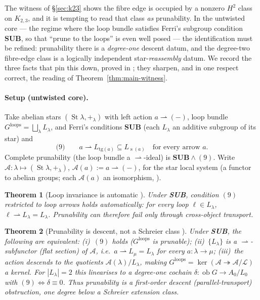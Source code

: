 \documentclass[11pt]{article}
\newtheorem{theorem}{Theorem}
\theoremstyle{definition}
\newcommand{\ob}{\operatorname{ob}}
\newcommand{\tg}{\mathrm{tg}}
\newcommand{\loops}{\mathrm{loops}}
\newcommand{\St}{\operatorname{St}}
\newcommand{\s}{\operatorname{s}}
\newcommand{\Lloc}{\mathcal{L}}
\newcommand{\A}{\mathcal{A}}
\begin{document}
The witness of \S\ref{sec:k23} shows the fibre edge is occupied by a nonzero $H^2$ class on
$K_{2,3}$, and it is tempting to read that class \emph{as} prunability. In the untwisted core ---
the regime where the loop bundle satisfies Ferri's subgroup condition \textbf{SUB}, so that
``prune to the loops'' is even well posed --- the identification must be refined: prunability there
is a \emph{degree-one} descent datum, and the degree-two fibre-edge class is a logically independent
star-\emph{reassembly} datum. We record the three facts that pin this down, proved in
\cite{descent}; they sharpen, and in one respect correct, the reading of
Theorem~\ref{thm:main-witness}.

\paragraph{Setup (untwisted core).} Take abelian stars $(\St\lambda,+_\lambda)$ with left action
$a\rightharpoonup(-)$, loop bundle $G^{\loops}=\bigsqcup_\lambda L_\lambda$, and Ferri's conditions
\textbf{SUB} (each $L_\lambda$ an additive subgroup of its star) and
\[
   \text{(9)}\qquad a\rightharpoonup L_{\tg(a)}\subseteq L_{\s(a)}\quad\text{for every arrow }a .
\]
Complete prunability (the loop bundle a $\rightharpoonup$-ideal) is $\textbf{SUB}\wedge(9)$. Write
$\A\colon\lambda\mapsto(\St\lambda,+_\lambda)$, $\A(a):=a\rightharpoonup(-)$, for the star local
system (a functor to abelian groups; each $\A(a)$ an isomorphism, \cite{converse}).

\begin{theorem}[Loop invariance is automatic {\cite[Thm.~A]{descent}}]\label{thm:loopauto}
Under \textbf{SUB}, condition $(9)$ restricted to loop arrows holds automatically: for every loop
$\ell\in L_\lambda$, $\ell\rightharpoonup L_\lambda=L_\lambda$. Prunability can therefore fail only
through cross-object transport.
\end{theorem}

\begin{theorem}[Prunability is descent, not a Schreier class {\cite[Thm.~B]{descent}}]\label{thm:descent}
Under \textbf{SUB}, the following are equivalent: \textup{(i)}~$(9)$ holds ($G^{\loops}$ is
prunable); \textup{(ii)}~$\{L_\lambda\}$ is a $\rightharpoonup$-subfunctor (flat section) of $\A$,
i.e.\ $a\rightharpoonup L_\mu=L_\lambda$ for every $a\colon\lambda\to\mu$; \textup{(iii)}~the action
descends to the quotients $\A(\lambda)/L_\lambda$, making $G^{\loops}=\ker(\A\twoheadrightarrow
\A/\Lloc)$ a kernel. For $|L_\lambda|=2$ this linearises to a \emph{degree-one} cochain
$\delta\colon\ob G\to A_0/L_0$ with $(9)\iff\delta\equiv0$. Thus prunability is a first-order
descent (parallel-transport) obstruction, one degree \emph{below} a Schreier extension class.
\end{theorem}
\end{document}
